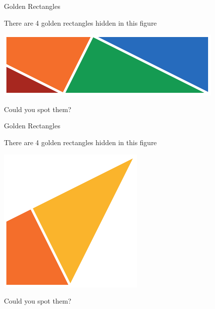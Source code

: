 \documentclass[14pt]{beamer}
\begin{document}

    \begin{frame}{Golden Rectangles}
        \begin{center}
            There are 4 golden rectangles hidden in this figure

            \bigskip

            \includegraphics[scale=0.71]{figures/figure020j.pdf} \\

            \medskip

            Could you spot them?
        \end{center}
    \end{frame}


    \begin{frame}{Golden Rectangles}
        \begin{center}
            There are 4 golden rectangles hidden in this figure

            \bigskip\bigskip

            \includegraphics[scale=1.0]{figures/figure020h.pdf} \\

            \bigskip

            Could you spot them?
        \end{center}
    \end{frame}
\end{document}
